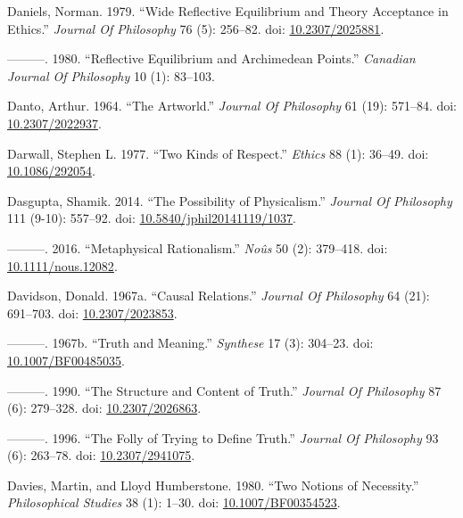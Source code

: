 \documentclass[
  10pt,
  letterpaper,
  DIV=11,
  numbers=noendperiod,
  twoside]{scrartcl}
\newlength{\cslhangindent}
\newenvironment{CSLReferences}[2] %
 {\begin{list}{}{%
  \setlength{\itemindent}{0pt}
  \setlength{\leftmargin}{0pt}
  \setlength{\parsep}{0pt}
  \ifodd #1
   \setlength{\leftmargin}{\cslhangindent}
   \setlength{\itemindent}{-1\cslhangindent}
  \fi
  \setlength{\itemsep}{#2\baselineskip}}}
 {\end{list}}
\begin{document}
\begin{CSLReferences}{1}{0}
Daniels, Norman. 1979. {``Wide Reflective Equilibrium and Theory
Acceptance in Ethics.''} \emph{Journal Of Philosophy} 76 (5): 256--82.
doi: \href{https://doi.org/10.2307/2025881}{10.2307/2025881}.

---------. 1980. {``Reflective Equilibrium and Archimedean Points.''}
\emph{Canadian Journal Of Philosophy} 10 (1): 83--103.

Danto, Arthur. 1964. {``The Artworld.''} \emph{Journal Of Philosophy} 61
(19): 571--84. doi:
\href{https://doi.org/10.2307/2022937}{10.2307/2022937}.

Darwall, Stephen L. 1977. {``Two Kinds of Respect.''} \emph{Ethics} 88
(1): 36--49. doi: \href{https://doi.org/10.1086/292054}{10.1086/292054}.

Dasgupta, Shamik. 2014. {``The Possibility of Physicalism.''}
\emph{Journal Of Philosophy} 111 (9-10): 557--92. doi:
\href{https://doi.org/10.5840/jphil20141119/1037}{10.5840/jphil20141119/1037}.

---------. 2016. {``Metaphysical Rationalism.''} \emph{Noûs} 50 (2):
379--418. doi:
\href{https://doi.org/10.1111/nous.12082}{10.1111/nous.12082}.

Davidson, Donald. 1967a. {``Causal Relations.''} \emph{Journal Of
Philosophy} 64 (21): 691--703. doi:
\href{https://doi.org/10.2307/2023853}{10.2307/2023853}.

---------. 1967b. {``Truth and Meaning.''} \emph{Synthese} 17 (3):
304--23. doi:
\href{https://doi.org/10.1007/BF00485035}{10.1007/BF00485035}.

---------. 1990. {``The Structure and Content of Truth.''} \emph{Journal
Of Philosophy} 87 (6): 279--328. doi:
\href{https://doi.org/10.2307/2026863}{10.2307/2026863}.

---------. 1996. {``The Folly of Trying to Define Truth.''}
\emph{Journal Of Philosophy} 93 (6): 263--78. doi:
\href{https://doi.org/10.2307/2941075}{10.2307/2941075}.

Davies, Martin, and Lloyd Humberstone. 1980. {``Two Notions of
Necessity.''} \emph{Philosophical Studies} 38 (1): 1--30. doi:
\href{https://doi.org/10.1007/BF00354523}{10.1007/BF00354523}.


\end{CSLReferences}
\end{document}
